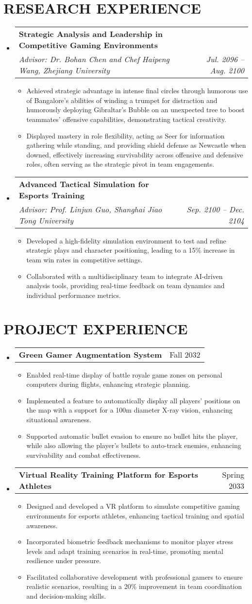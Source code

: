 \documentclass[letterpaper, 11pt]{article}
\makeatletter
\newcommand{\resumeItem}[1]{
	\item\small{
		{#1 \vspace{-2pt}}
	}
}
\newcommand{\resumeSubheading}[4]{
	\vspace{-2pt}\item
	\begin{tabular*}{0.97\textwidth}[t]{l@{\extracolsep{\fill}}r}
		\textbf{#1} & #2 \\
		\textit{\small#3} & \textit{\small #4} \\
	\end{tabular*}\vspace{-7pt}
}
\newcommand{\resumeProjectHeading}[2]{
	\item
	\begin{tabular*}{0.97\textwidth}{l@{\extracolsep{\fill}}r}
		\small#1 & #2 \\
	\end{tabular*}\vspace{-7pt}
}
\newcommand{\resumeSubHeadingListStart}{\begin{itemize}[leftmargin=0in, label={}]}
\newcommand{\resumeSubHeadingListEnd}{\end{itemize}}
\newcommand{\resumeItemListStart}{\begin{itemize}}
\newcommand{\resumeItemListEnd}{\end{itemize}\vspace{-5pt}}
\makeatother
\begin{document}
	\section{RESEARCH EXPERIENCE}
	\resumeSubHeadingListStart
	\resumeSubheading
	{Strategic Analysis and Leadership in Competitive Gaming Environments}{}
	{Advisor: Dr. Bohan Chen and Chef Haipeng Wang, Zhejiang University}{Jul. 2096 – Aug. 2100}
	\resumeItemListStart
	\resumeItem{Achieved strategic advantage in intense final circles through humorous use of Bangalore's abilities of winding a trumpet for distraction and humorously deploying Gibraltar's Bubble on an unexpected tree to boost teammates' offensive capabilities, demonstrating tactical creativity.}
	\resumeItem{Displayed mastery in role flexibility, acting as Seer for information gathering while standing, and providing shield defense as Newcastle when downed, effectively increasing survivability across offensive and defensive roles, often serving as the strategic pivot in team engagements.}
	\resumeItemListEnd
	\resumeSubheading
	{Advanced Tactical Simulation for Esports Training}{}
	{Advisor: Prof. Linjun Guo, Shanghai Jiao Tong University}{Sep. 2100 – Dec. 2104}
	\resumeItemListStart
	\resumeItem{Developed a high-fidelity simulation environment to test and refine strategic plays and character positioning, leading to a 15\% increase in team win rates in competitive settings.}
	\resumeItem{Collaborated with a multidisciplinary team to integrate AI-driven analysis tools, providing real-time feedback on team dynamics and individual performance metrics.}
	\resumeItemListEnd
	\resumeSubHeadingListEnd
	
	\section{PROJECT EXPERIENCE}
	\resumeSubHeadingListStart
	\resumeProjectHeading
	{\textbf{Green Gamer Augmentation System}}{Fall 2032}
	\resumeItemListStart
	\resumeItem{Enabled real-time display of battle royale game zones on personal computers during flights, enhancing strategic planning.}
	\resumeItem{Implemented a feature to automatically display all players' positions on the map with a support for a 100m diameter X-ray vision, enhancing situational awareness.}
	\resumeItem{Supported automatic bullet evasion to ensure no bullet hits the player, while also allowing the player's bullets to auto-track enemies, enhancing survivability and combat effectiveness.}
	\resumeItemListEnd
	\resumeProjectHeading
	{\textbf{Virtual Reality Training Platform for Esports Athletes}}{Spring 2033}
	\resumeItemListStart
	\resumeItem{Designed and developed a VR platform to simulate competitive gaming environments for esports athletes, enhancing tactical training and spatial awareness.}
	\resumeItem{Incorporated biometric feedback mechanisms to monitor player stress levels and adapt training scenarios in real-time, promoting mental resilience under pressure.}
	\resumeItem{Facilitated collaborative development with professional gamers to ensure realistic scenarios, resulting in a 20\% improvement in team coordination and decision-making skills.}
	\resumeItemListEnd
	\resumeSubHeadingListEnd
	
\end{document}
